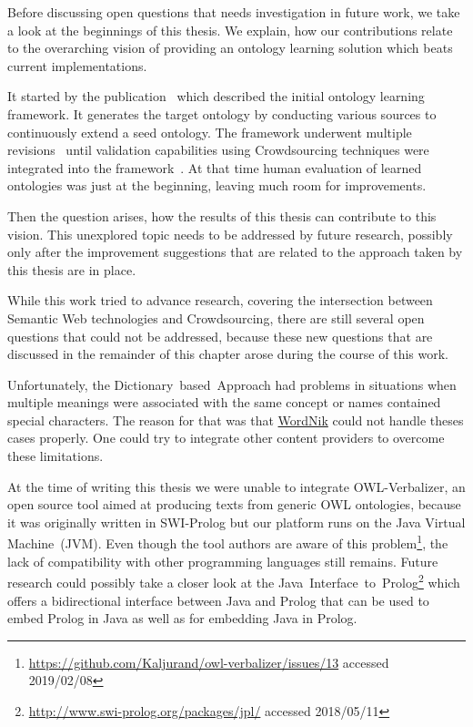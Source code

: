 Before discussing open questions that needs investigation in future work, we take a look at the beginnings of this thesis. We explain, how our contributions relate to the overarching vision of providing an ontology learning solution which beats current implementations. 

It started by the publication~\cite{liu2005semi} which described the initial ontology learning framework. It generates the target ontology by conducting various sources to continuously extend a seed ontology. The framework underwent multiple revisions~\cite{weichselbraun2010_a, weichselbraun2010_b} until validation capabilities using Crowdsourcing techniques were integrated into the framework~\cite{wohlgenannt2012}.  
At that time human evaluation of learned ontologies was just at the beginning, leaving much room for improvements. 

Then the question arises, how the results of this thesis can contribute to this vision. This unexplored topic needs to be addressed by future research, possibly only after the improvement suggestions that are related to the approach taken by this thesis are in place. 

While this work tried to advance research, covering the intersection between Semantic Web technologies and Crowdsourcing, there are still several open questions that could not be addressed, because these new questions that are discussed in the remainder of this chapter arose during the course of this work.

Unfortunately, the Dictionary~based~Approach had problems in situations when multiple meanings were associated with the same concept or names contained special characters. The reason for that was that \hyperref[sec:wordnik]{WordNik} could not handle theses cases properly. One could try to integrate other content providers to overcome these limitations. 

At the time of writing this thesis we were unable to integrate OWL-Verbalizer, an open source tool aimed at producing texts from generic OWL ontologies, because it was originally written in SWI-Prolog but our platform runs on the Java Virtual Machine~(JVM). Even though the tool authors are aware of this problem\footnote{\url{https://github.com/Kaljurand/owl-verbalizer/issues/13} accessed 2019/02/08}, the lack of compatibility with other programming languages still remains. Future research could possibly take a closer look at the Java~Interface~to~Prolog\footnote{\url{http://www.swi-prolog.org/packages/jpl/} accessed 2018/05/11} which offers a bidirectional interface between Java and Prolog that can be used to embed Prolog in Java as well as for embedding Java in Prolog. 

